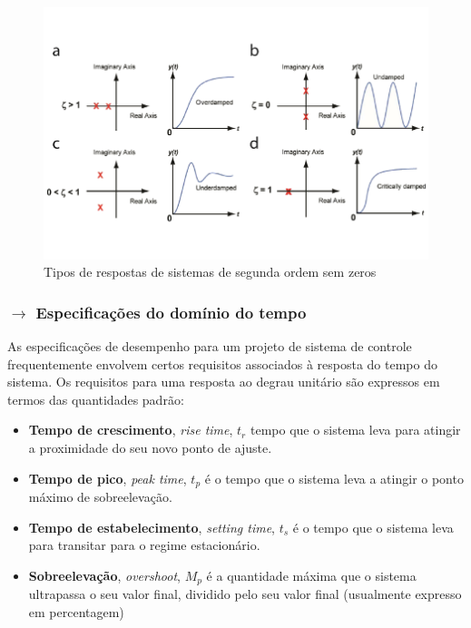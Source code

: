 \vspace{-2em}
\begin{figure}[H]
    \centering
    \includegraphics[width = 0.8\linewidth]{img/2/second-order-system.png}
    \caption{Tipos de respostas de sistemas de segunda ordem sem zeros}
    \label{fig:LABEL}
\end{figure}

\subsubsection[2.1.3 Especificações do domínio do tempo]{$\pmb{\rightarrow}$ Especificações do domínio do tempo}

\noindent As especificações de desempenho para um projeto de sistema de controle frequentemente envolvem certos requisitos associados à resposta do tempo do sistema. Os requisitos para uma resposta ao degrau unitário são expressos em termos das quantidades padrão:

\begin{itemize}
    \item \textbf{Tempo de crescimento}, \textit{rise time}, $t_r$ tempo que o sistema leva para atingir a proximidade do seu novo ponto de ajuste.
    \item \textbf{Tempo de pico}, \textit{peak time}, $t_p$ é o tempo que o sistema leva a atingir o ponto máximo de sobreelevação.
    \item \textbf{Tempo de estabelecimento}, \textit{setting time}, $t_s$ é o tempo que o sistema leva para transitar para o regime estacionário.
    \item \textbf{Sobreelevação}, \textit{overshoot}, $M_p$ é a quantidade máxima que o sistema ultrapassa o seu valor final, dividido pelo seu valor final (usualmente expresso em percentagem)
\end{itemize}

